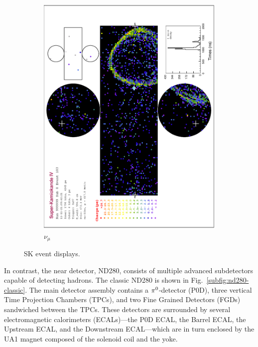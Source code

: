 \begin{figure}
\begin{subfigure}[b]{\dbfigwid\textwidth}
        \includegraphics[width=\textwidth]{figures/t2k/sk-numu.eps}
        \caption{\(\nu_\mu\)}
        \label{subfig:sk-numu}
    \end{subfigure}
    \caption{SK event displays.}
    \label{fig:sk-e-mu}
\end{figure}

In contrast, the near detector, ND280, consists of multiple advanced subdetectors capable of detecting hadrons.
The classic ND280 is shown in Fig.~\ref{subfig:nd280-classic}.
The main detector assembly contains a \(\pi^0\)-detector (P0D), three vertical Time Projection Chambers (TPCs), and two Fine Grained Detectors (FGDs) sandwiched between the TPCs.
These detectors are surrounded by several electromagnetic calorimeters (ECALs)—the P0D ECAL, the Barrel ECAL, the Upstream ECAL, and the Downstream ECAL—which are in turn enclosed by the UA1 magnet composed of the solenoid coil and the yoke.


